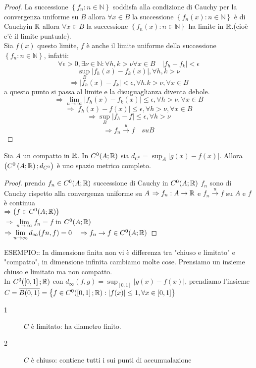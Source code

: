 \begin{proof}
	La successione $\left\{ f_n:n\in\mathbb{N}\right\}$ soddisfa alla condizione di Cauchy per la convergenza uniforme su $B$ allora $\forall x\in B$ la successione $\left\{ f_n(x) :n\in\mathbb{N} \right\}$ è di Cauchyin $ \mathbb{R}$ allora $\forall x \in B$ la successione $\left\{ f_n(x):n\in\mathbb{N} \right\}$ ha limite in $ \mathbb{R}$.(cioè c'è il limite puntuale).\\
	Sia $f(x)$ questo limite, $f$ è anche il limite uniforme della successione $\left\{ f_n:n\in\mathbb{N} \right\}$, infatti:
	$$\forall\epsilon>0, \exists\nu\in\mathbb{N}: \forall h,k>\nu \forall x\in B \quad \left| f_h-f_k \right|<\epsilon$$
	$$\sup\limits_B\left|f_h(x)-f_k(x)\right|, \forall h,k>\nu$$
	$$\Rightarrow \left|f_h(x)-f_k\right|<\epsilon,\forall h.k>\nu, \forall x \in B$$
	a questo punto si passa al limite e la disuguaglianza diventa debole.
	$$\Rightarrow \lim\limits_{n\to\infty}\left| f_h(x)-f_k(x) \right|\le\epsilon, \forall h>\nu, \forall x\in B$$
	$$\Rightarrow\left| f_h(x)-f(x) \right|\le\epsilon, \forall h>\nu, \forall x\in B$$
	$$\Rightarrow\sup\limits_B\left| f_h-f \right|\le\epsilon, \forall h>\nu$$
	$$\Rightarrow f_n\overset{u}{\to}f\quad su B$$
\end{proof}
\proposition
Sia $A$ un compatto in $ \mathbb{R}$. In $C^0(A; \mathbb{R})$ sia $d_{C^0}=\sup_A\left| g(x)-f(x) \right|$. Allora $\left( C^0\left(A; \mathbb{R}\right);d_{C^0}\right)$ è uno spazio metrico completo.
\begin{proof}
	prendo $f_n\in C^0(A; \mathbb{R})$ successione di Cauchy in $C^0(A; \mathbb{R})$
	$f_n$ sono di Cauchy rispetto alla convergenza uniforme su $A$
	$\Rightarrow f_n:A\to \mathbb{R}$ e $f_n\overset{u}{\to}f$ su $A$ e $f$ è continua\\ $\Rightarrow\left(f\in C^0(A; \mathbb{R})\right)$\\
	$\Rightarrow\lim\limits_{n\to\infty}f_n=f$ in $C^0(A; \mathbb{R})$\\
	$\Rightarrow\lim\limits_{n\to\infty}d_{\infty}(fn,f)=0\quad\Rightarrow f_n\to f\in C^0(A; \mathbb{R})$
\end{proof}
ESEMPIO:: In dimensione finita non vi è differenza tra "chiuso e limitato" e "compatto", in dimensione infinita cambiamo molte cose.
Prensiamo un insieme chiuso e limitato ma non compatto.\\
In $C^0(\left[0,1\right]; \mathbb{R})$ con $d_\infty(f,g)=\sup_{\left[0,1\right]}\left|g(x)-f(x)\right|$, prendiamo l'insieme $C=\overline{B(0,1)}=\left\{f\in C^0(\left[0,1\right]; \mathbb{R}):\left|f(x)\right|\le 1, \forall x \in\left[0,1\right]\right\}$
\begin{description}
	\item[1] $C$ è limitato: ha diametro finito.
	\item[2] $C$ è chiuso: contiene tutti i sui punti di accumualazione
\end{description}
